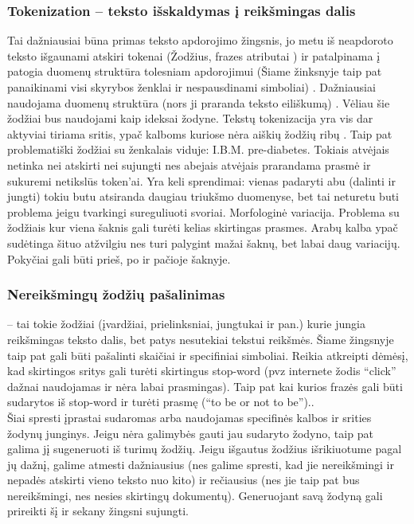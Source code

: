 \documentclass{VUMIFInfKursinis}
\begin{document}
		\subsubsection{Tokenization – teksto išskaldymas į reikšmingas dalis}
			Tai dažniausiai būna primas teksto apdorojimo žingsnis, jo metu iš neapdoroto teksto išgaunami atskiri tokenai (Žodžius, frazes atributai ) ir patalpinama į patogia duomenų struktūra tolesniam apdorojimui (Šiame žinksnyje taip pat panaikinami visi skyrybos ženklai ir nespausdinami simboliai) . Dažniausiai naudojama  duomenų struktūra (nors ji praranda teksto eiliškumą) . Vėliau šie žodžiai bus naudojami kaip ideksai žodyne.
			Tekstų tokenizacija yra vis dar aktyviai tiriama sritis, ypač kalboms kuriose nėra aiškių žodžių ribų . Taip pat problematiški žodžiai su ženkalais viduje: I.B.M.\; pre-diabetes. Tokiais atvėjais netinka nei atskirti nei sujungti nes abejais atvėjais prarandama prasmė ir sukuremi netikslūs token’ai. Yra keli sprendimai: vienas padaryti abu (dalinti ir jungti) tokiu butu atsiranda daugiau triukšmo duomenyse, bet tai neturetu buti problema jeigu tvarkingi sureguliuoti svoriai. 
			Morfologinė variacija. Problema su žodžiais kur viena šaknis gali turėti kelias skirtingas prasmes. Arabų kalba ypač sudėtinga šituo atžvilgiu nes turi palygint mažai šaknų, bet labai daug variacijų. Pokyčiai gali būti prieš, po ir pačioje šaknyje.

		\subsubsection{Nereikšmingų žodžių pašalinimas}
			 – tai tokie žodžiai (įvardžiai, prielinksniai, jungtukai ir pan.) kurie jungia reikšmingas teksto dalis, bet patys nesutekiai tekstui reikšmės. Šiame žingsnyje taip pat gali būti pašalinti skaičiai ir specifiniai simboliai. Reikia atkreipti dėmėsį, kad skirtingos sritys gali turėti skirtingus stop-word (pvz internete žodis “click” dažnai naudojamas ir nėra labai prasmingas). Taip pat kai kurios frazės gali būti sudarytos iš stop-word ir turėti prasmę (“to be or not to be”)..\\
			Šiai spresti įprastai sudaromas arba naudojamas specifinės kalbos ir srities žodynų junginys. Jeigu nėra galimybės gauti jau sudaryto žodyno, taip pat galima jį sugeneruoti iš turimų žodžių. Jeigu išgautus žodžius išrikiuotume pagal jų dažnį, galime atmesti dažniausius (nes galime spresti, kad jie nereikšmingi ir nepadės atskirti vieno teksto nuo kito) ir rečiausius (nes jie taip pat bus nereikšmingi, nes nesies skirtingų dokumentų). Generuojant savą žodyną gali prireikti šį ir sekany žingsni sujungti. 
\end{document}

